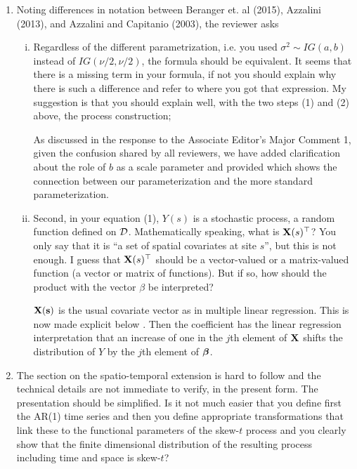 \documentclass[11pt]{article}
\begin{document}
\begin{enumerate}[1.]
\begin{enumerate}[i.]
  \end{enumerate}

  \item Noting differences in notation between Beranger et. al (2015), Azzalini (2013), and Azzalini and Capitanio (2003), the reviewer asks
  \begin{enumerate}[i.]
    \item Regardless of the different parametrization, i.e. you used $\sigma^2 \sim IG(a, b)$ instead of $IG(\nu/2, \nu/2)$, the formula should be equivalent. It seems that there is a missing term in your formula, if not you should explain why there is such a difference and refer to where you got that expression. My suggestion is that you should explain well, with the two steps (1) and (2) above, the process construction; \\

    \begin{response}
      As discussed in the response to the Associate Editor's Major Comment 1, given the confusion shared by all reviewers, we have added clarification about the role of $b$ as a scale parameter and provided  which shows the connection between our parameterization and the more standard parameterization.
    \end{response}

    \item Second, in your equation (1), $Y(s)$ is a stochastic process, a random function defined on ${\cal D}$. Mathematically speaking, what is $\mbox{\bf X}(s)^\top$? You only say that it is ``a set of spatial covariates at site $s$'', but this is not enough. I guess that $\mbox{\bf X}(s)^\top$ should be a vector-valued or a matrix-valued function (a vector or matrix of functions). But if so, how should the product with the vector $\beta$ be interpreted? \\

    \begin{response}
      $\mbox{\bf X}(\mbox{\bf s})$ is the usual covariate vector as in multiple linear regression.
      This is now made explicit below .
      Then the coefficient has the linear regression interpretation that an increase of one in the $j$th element of $\mbox{\bf X}$ shifts the distribution of $Y$ by the $j$th element of $\mbox{\boldmath $\beta$}$.
    \end{response}

  \end{enumerate}

  \item The section on the spatio-temporal extension is hard to follow and the technical details are not immediate to verify, in the present form. The presentation should be simplified. Is it not much easier that you define first the AR(1) time series and then you define appropriate transformations that link these to the functional parameters of the skew-$t$ process and you clearly show that the finite dimensional distribution of the resulting process including time and space is skew-$t$? \\


\end{enumerate}
\end{document}

